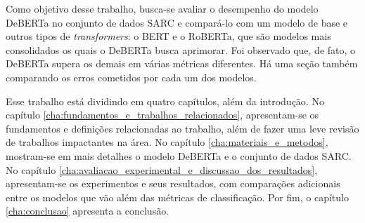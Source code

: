 Como objetivo desse trabalho, busca-se avaliar o desempenho do modelo DeBERTa no
conjunto de dados SARC e compará-lo com um modelo de base e outros tipos de
\textit{transformers}: o BERT e o RoBERTa, que são modelos mais consolidados os
quais o DeBERTa busca aprimorar. Foi observado que, de fato, o DeBERTa supera
os demais em várias métricas diferentes. Há uma seção também comparando os
erros cometidos por cada um dos modelos. \citep{devlin-etal:2018:bert,
liu-etal:2019:roberta}

Esse trabalho está dividindo em quatro capítulos, além da introdução. No
capítulo \ref{cha:fundamentos_e_trabalhos_relacionados}, apresentam-se os
fundamentos e definições relacionadas ao trabalho, além de fazer uma leve
revisão de trabalhos impactantes na área. No capítulo
\ref{cha:materiais_e_metodos}, mostram-se em mais detalhes o modelo DeBERTa e o
conjunto de dados SARC. No capítulo
\ref{cha:avaliacao_experimental_e_discussao_dos_resultados}, apresentam-se os
experimentos e seus resultados, com comparações adicionais entre os modelos que
vão além das métricas de classificação. Por fim, o capítulo \ref{cha:conclusao}
apresenta a conclusão.




